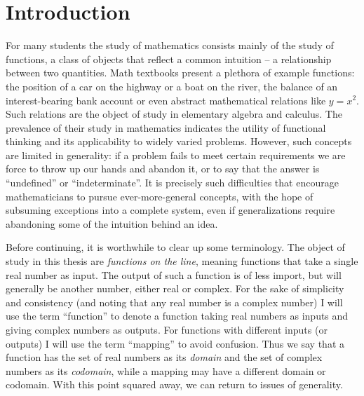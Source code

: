 \chapter*{Introduction}

  For many students the study of mathematics consists mainly of the study of functions, a class of objects that reflect a common intuition -- a relationship between two quantities.
  Math textbooks present a plethora of example functions: the position of a car on the highway or a boat on the river, the balance of an interest-bearing bank account or even abstract mathematical relations like $y=x^2$.
  Such relations are the object of study in elementary algebra and calculus. 
  The prevalence of their study in mathematics indicates the utility of functional thinking and its applicability to widely varied problems.
  However, such concepts are limited in generality: if a problem fails to meet certain requirements we are force to throw up our hands and abandon it, or to say that the answer is ``undefined'' or ``indeterminate''.
  It is precisely such difficulties that encourage mathematicians to pursue ever-more-general concepts, with the hope of subsuming exceptions into a complete system, even if generalizations require abandoning some of the intuition behind an idea.

  Before continuing, it is worthwhile to clear up some terminology.
  The object of study in this thesis are \emph{functions on the line}, meaning functions that take a single real number as input.
  The output of such a function is of less import, but will generally be another number, either real or complex.
  For the sake of simplicity and consistency (and noting that any real number is a complex number) I will use the term ``function'' to denote a function taking real numbers as inputs and giving complex numbers as outputs.
  For functions with different inputs (or outputs) I will use the term ``mapping'' to avoid confusion.
  Thus we say that a function has the set of real numbers as its \emph{domain} and the set of complex numbers as its \emph{codomain}, while a mapping may have a different domain or codomain.
  With this point squared away, we can return to issues of generality.

